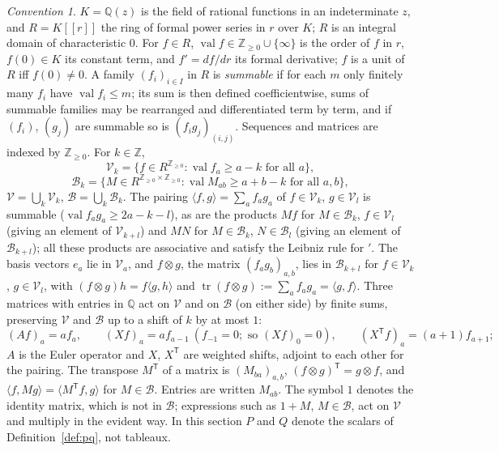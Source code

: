\documentclass[11pt]{article}
\theoremstyle{definition}
\theoremstyle{remark}
\newtheorem{convention}[theorem]{Convention}
\newcommand{\Z}{\mathbb{Z}}
\newcommand{\tr}{\operatorname{tr}}
\begin{document}
\begin{convention}\label{conv:formal}
$K=\mathbb Q(z)$ is the field of rational functions in an indeterminate $z$, and $R=K[[r]]$ the ring of formal power series in $r$ over $K$; $R$ is an integral domain of characteristic $0$. For $f\in R$, $\operatorname{val}f\in\Z_{\ge0}\cup\{\infty\}$ is the order of $f$ in $r$, $f(0)\in K$ its constant term, and $f'=df/dr$ its formal derivative; $f$ is a unit of $R$ iff $f(0)\ne0$. A family $(f_i)_{i\in I}$ in $R$ is \emph{summable} if for each $m$ only finitely many $f_i$ have $\operatorname{val}f_i\le m$; its sum is then defined coefficientwise, sums of summable families may be rearranged and differentiated term by term, and if $(f_i)$, $(g_j)$ are summable so is $(f_ig_j)_{(i,j)}$. Sequences and matrices are indexed by $\Z_{\ge0}$. For $k\in\Z$,
\[
\mathcal V_k=\{f\in R^{\Z_{\ge0}}:\operatorname{val}f_a\ge a-k\text{ for all }a\},
\]
\[
\mathcal B_k=\{M\in R^{\Z_{\ge0}\times\Z_{\ge0}}:\operatorname{val}M_{ab}\ge a+b-k\text{ for all }a,b\},
\]
$\mathcal V=\bigcup_k\mathcal V_k$, $\mathcal B=\bigcup_k\mathcal B_k$. The pairing $\langle f,g\rangle=\sum_af_ag_a$ of $f\in\mathcal V_k$, $g\in\mathcal V_l$ is summable ($\operatorname{val}f_ag_a\ge2a-k-l$), as are the products $Mf$ for $M\in\mathcal B_k$, $f\in\mathcal V_l$ (giving an element of $\mathcal V_{k+l}$) and $MN$ for $M\in\mathcal B_k$, $N\in\mathcal B_l$ (giving an element of $\mathcal B_{k+l}$); all these products are associative and satisfy the Leibniz rule for $'$. The basis vectors $e_a$ lie in $\mathcal V_a$, and $f\otimes g$, the matrix $(f_ag_b)_{a,b}$, lies in $\mathcal B_{k+l}$ for $f\in\mathcal V_k$, $g\in\mathcal V_l$, with $(f\otimes g)h=f\langle g,h\rangle$ and $\tr(f\otimes g):=\sum_af_ag_a=\langle g,f\rangle$. Three matrices with entries in $\mathbb Q$ act on $\mathcal V$ and on $\mathcal B$ (on either side) by finite sums, preserving $\mathcal V$ and $\mathcal B$ up to a shift of $k$ by at most $1$:
\[
(Af)_a=af_a,\qquad (Xf)_a=af_{a-1}\ (f_{-1}=0;\text{ so }(Xf)_0=0),\qquad (X^{\mathsf T}f)_a=(a+1)f_{a+1};
\]
$A$ is the Euler operator and $X$, $X^{\mathsf T}$ are weighted shifts, adjoint to each other for the pairing. The transpose $M^{\mathsf T}$ of a matrix is $(M_{ba})_{a,b}$, $(f\otimes g)^{\mathsf T}=g\otimes f$, and $\langle f,Mg\rangle=\langle M^{\mathsf T}f,g\rangle$ for $M\in\mathcal B$. Entries are written $M_{ab}$. The symbol $1$ denotes the identity matrix, which is not in $\mathcal B$; expressions such as $1+M$, $M\in\mathcal B$, act on $\mathcal V$ and multiply in the evident way. In this section $P$ and $Q$ denote the scalars of Definition~\ref{def:pq}, not tableaux.
\end{convention}
\end{document}
